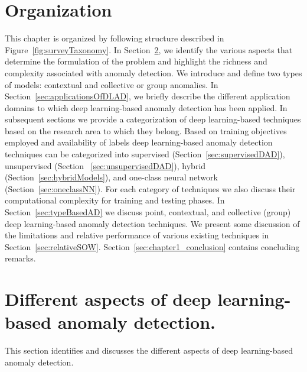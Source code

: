 \section{Organization}
This chapter is organized by following structure described in Figure~\ref{fig:surveyTaxonomy}.
In Section~\ref{sec:aspectsOfAnomalyDetection}, we identify the various aspects that determine the formulation of the problem and highlight the richness and complexity associated with anomaly detection.
We introduce and define two types of models: contextual and collective or group anomalies. In Section~\ref{sec:applicationsOfDLAD}, we briefly describe the different application domains to which deep learning-based anomaly detection has been applied. In subsequent sections we provide a categorization of deep learning-based techniques based on the research area to which they belong.  Based on training objectives employed and availability of labels  deep learning-based anomaly detection techniques  can be categorized into supervised (Section~\ref{sec:supervisedDAD}), unsupervised (Section ~\ref{sec:unsupervisedDAD}), hybrid (Section~\ref{sec:hybridModels}), and one-class neural network  (Section~\ref{sec:oneclassNN}). For each category of techniques we also discuss their computational complexity for training and testing phases. In Section~\ref{sec:typeBasedAD} we discuss  point, contextual, and collective (group) deep learning-based anomaly detection techniques. We present some discussion of the limitations and relative performance of various existing techniques in Section~\ref{sec:relativeSOW}. Section~\ref{sec:chapter1_conclusion} contains concluding remarks.


\section{Different aspects of deep learning-based anomaly detection. }
\label{sec:aspectsOfAnomalyDetection}
This section identifies and discusses the different aspects of deep learning-based anomaly detection.

